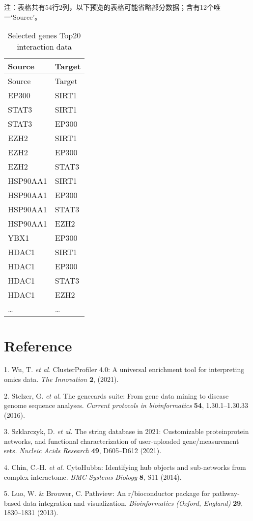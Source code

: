 \documentclass[
]{article}
\newenvironment{cslreferences}%
  {}%
  {\par}
\begin{document}
\begin{center}\begin{tcolorbox}[colback=gray!10, colframe=gray!50, width=0.9\linewidth, arc=1mm, boxrule=0.5pt]注：表格共有54行2列，以下预览的表格可能省略部分数据；含有12个唯一`Source'。
\end{tcolorbox}
\end{center}

\begin{longtable}[]{@{}ll@{}}
\caption{\label{tab:Selected-genes-Top20-interaction-data}Selected genes Top20 interaction data}\tabularnewline
\toprule
Source & Target\tabularnewline
\midrule
\endfirsthead
\toprule
Source & Target\tabularnewline
\midrule
\endhead
EP300 & SIRT1\tabularnewline
STAT3 & SIRT1\tabularnewline
STAT3 & EP300\tabularnewline
EZH2 & SIRT1\tabularnewline
EZH2 & EP300\tabularnewline
EZH2 & STAT3\tabularnewline
HSP90AA1 & SIRT1\tabularnewline
HSP90AA1 & EP300\tabularnewline
HSP90AA1 & STAT3\tabularnewline
HSP90AA1 & EZH2\tabularnewline
YBX1 & EP300\tabularnewline
HDAC1 & SIRT1\tabularnewline
HDAC1 & EP300\tabularnewline
HDAC1 & STAT3\tabularnewline
HDAC1 & EZH2\tabularnewline
\ldots{} & \ldots{}\tabularnewline
\bottomrule
\end{longtable}

\hypertarget{bibliography}{%
\section*{Reference}\label{bibliography}}

\hypertarget{refs}{}
\begin{cslreferences}
\leavevmode\hypertarget{ref-ClusterprofilerWuTi2021}{}%
1. Wu, T. \emph{et al.} ClusterProfiler 4.0: A universal enrichment tool for interpreting omics data. \emph{The Innovation} \textbf{2}, (2021).

\leavevmode\hypertarget{ref-TheGenecardsSStelze2016}{}%
2. Stelzer, G. \emph{et al.} The genecards suite: From gene data mining to disease genome sequence analyses. \emph{Current protocols in bioinformatics} \textbf{54}, 1.30.1--1.30.33 (2016).

\leavevmode\hypertarget{ref-TheStringDataSzklar2021}{}%
3. Szklarczyk, D. \emph{et al.} The string database in 2021: Customizable proteinprotein networks, and functional characterization of user-uploaded gene/measurement sets. \emph{Nucleic Acids Research} \textbf{49}, D605--D612 (2021).

\leavevmode\hypertarget{ref-CytohubbaIdenChin2014}{}%
4. Chin, C.-H. \emph{et al.} CytoHubba: Identifying hub objects and sub-networks from complex interactome. \emph{BMC Systems Biology} \textbf{8}, S11 (2014).

\leavevmode\hypertarget{ref-PathviewAnRLuoW2013}{}%
5. Luo, W. \& Brouwer, C. Pathview: An r/bioconductor package for pathway-based data integration and visualization. \emph{Bioinformatics (Oxford, England)} \textbf{29}, 1830--1831 (2013).
\end{cslreferences}
\end{document}
